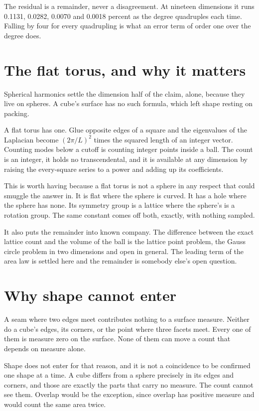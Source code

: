 The residual is a remainder, never a disagreement. At nineteen dimensions it runs 0.1131, 0.0282, 0.0070 and 0.0018 percent as the degree quadruples each time. Falling by four for every quadrupling is what an error term of order one over the degree does.

\section{The flat torus, and why it matters}

Spherical harmonics settle the dimension half of the claim, alone, because they live on spheres. A cube's surface has no such formula, which left shape resting on packing.

A flat torus has one. Glue opposite edges of a square and the eigenvalues of the Laplacian become $(2\pi/L)^2$ times the squared length of an integer vector. Counting modes below a cutoff is counting integer points inside a ball. The count is an integer, it holds no transcendental, and it is available at any dimension by raising the every-square series to a power and adding up its coefficients.

This is worth having because a flat torus is not a sphere in any respect that could smuggle the answer in. It is flat where the sphere is curved. It has a hole where the sphere has none. Its symmetry group is a lattice where the sphere's is a rotation group. The same constant comes off both, exactly, with nothing sampled.

It also puts the remainder into known company. The difference between the exact lattice count and the volume of the ball is the lattice point problem, the Gauss circle problem in two dimensions and open in general. The leading term of the area law is settled here and the remainder is somebody else's open question.

\section{Why shape cannot enter}

A seam where two edges meet contributes nothing to a surface measure. Neither do a cube's edges, its corners, or the point where three facets meet. Every one of them is measure zero on the surface. None of them can move a count that depends on measure alone.

Shape does not enter for that reason, and it is not a coincidence to be confirmed one shape at a time. A cube differs from a sphere precisely in its edges and corners, and those are exactly the parts that carry no measure. The count cannot see them. Overlap would be the exception, since overlap has positive measure and would count the same area twice.

